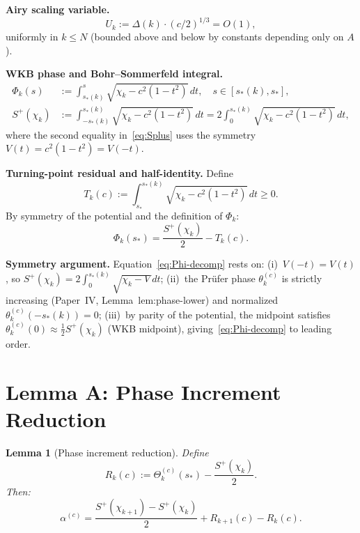 \documentclass[12pt]{amsart}
\newtheorem{lemma}[theorem]{Lemma}
\begin{document}
\medskip
\noindent\textbf{Airy scaling variable.}
\begin{equation}\label{eq:Uk}
  U_k := \Delta(k) \cdot (c/2)^{1/3} = O(1),
\end{equation}
uniformly in $k \le N$ (bounded above and below by constants
depending only on $A$).

\medskip
\noindent\textbf{WKB phase and Bohr--Sommerfeld integral.}
\begin{align}
  \Phi_k(s) &:= \int_{s_*(k)}^{s}
    \sqrt{\chi_k - c^2(1-t^2)}\,dt, \quad s \in [s_*(k), s_*],
  \label{eq:Phi} \\
  S^+(\chi_k) &:= \int_{-s_*(k)}^{s_*(k)}
    \sqrt{\chi_k - c^2(1-t^2)}\,dt
  = 2\int_0^{s_*(k)} \sqrt{\chi_k - c^2(1-t^2)}\,dt,
  \label{eq:Splus}
\end{align}
where the second equality in~\eqref{eq:Splus} uses the symmetry
$V(t) = c^2(1-t^2) = V(-t)$.

\medskip
\noindent\textbf{Turning-point residual and half-identity.}
Define
\begin{equation}\label{eq:Tk-def}
  T_k(c) := \int_{s_*}^{s_*(k)}
    \sqrt{\chi_k - c^2(1-t^2)}\,dt \ge 0.
\end{equation}
By symmetry of the potential and the definition of $\Phi_k$:
\begin{equation}\label{eq:Phi-decomp}
  \Phi_k(s_*) = \frac{S^+(\chi_k)}{2} - T_k(c).
\end{equation}

\medskip
\noindent\textbf{Symmetry argument.}
Equation~\eqref{eq:Phi-decomp} rests on:
(i)~$V(-t) = V(t)$, so $S^+(\chi_k) = 2\int_0^{s_*(k)}\sqrt{\chi_k-V}\,dt$;
(ii)~the Pr\"ufer phase $\theta_k^{(c)}$ is strictly increasing
(Paper~IV, Lemma~lem:phase-lower) and normalized
$\theta_k^{(c)}(-s_*(k)) = 0$;
(iii)~by parity of the potential, the midpoint satisfies
$\theta_k^{(c)}(0) \approx \frac12 S^+(\chi_k)$ (WKB midpoint),
giving~\eqref{eq:Phi-decomp} to leading order.

\section{Lemma A: Phase Increment Reduction}
\label{sec:lemmaA}

\begin{lemma}[Phase increment reduction]
\label{lem:A}
Define
\begin{equation}\label{eq:Rk}
  R_k(c) := \Theta_k^{(c)}(s_*) - \frac{S^+(\chi_k)}{2}.
\end{equation}
Then:
\begin{equation}\label{eq:alpha-reduction}
  \alpha^{(c)}
  = \frac{S^+(\chi_{k+1}) - S^+(\chi_k)}{2}
    + R_{k+1}(c) - R_k(c).
\end{equation}
\end{lemma}
\end{document}
